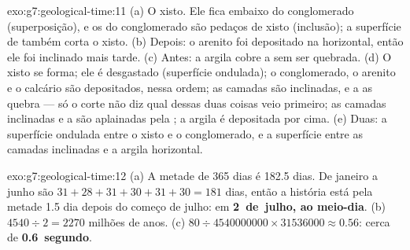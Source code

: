 \begin{solution}{exo:g7:geological-time:11}
(a) O xisto. Ele fica embaixo do conglomerado (superposição), e os 
do conglomerado são pedaços de xisto (inclusão); a superfície de 
também corta o xisto. (b) Depois: o arenito foi depositado na horizontal,
então ele foi inclinado mais tarde. (c) Antes: a argila cobre a  sem
ser quebrada. (d) O xisto se forma; ele é desgastado (superfície
ondulada); o conglomerado, o arenito e o calcário são depositados, nessa
ordem; as camadas são inclinadas, e a  as quebra --- só o corte não
diz qual dessas duas coisas veio primeiro; as camadas inclinadas e a
 são aplainadas pela ; a argila é depositada por cima.
(e) Duas: a superfície ondulada entre o xisto e o conglomerado, e a
superfície entre as camadas inclinadas e a argila horizontal.
\end{solution}

\begin{solution}{exo:g7:geological-time:12}
(a) A metade de 365 dias é 182.5 dias. De janeiro a junho são
$31+28+31+30+31+30 = 181$ dias, então a história está pela metade 1.5 dia
depois do começo de julho: em \textbf{2~de~julho, ao meio-dia}. (b) $4540 \div 2 = 2270$ milhões
de anos. (c) $80 \div \num{4540000000} \times \num{31536000} \approx 0.56$:
cerca de \textbf{0.6~segundo}.
\end{solution}

